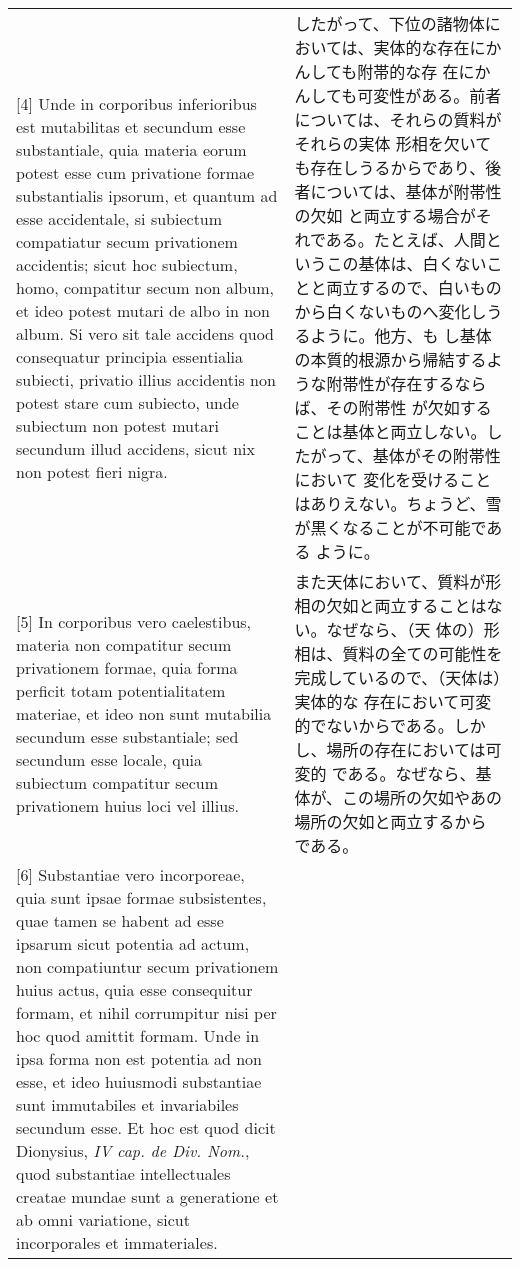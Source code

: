 \documentclass[10pt]{jsarticle} %
\begin{document}
\begin{longtable}{p{21em}p{21em}}
\\

[4] Unde in corporibus inferioribus est mutabilitas et secundum esse
substantiale, quia materia eorum potest esse cum privatione formae
substantialis ipsorum, et quantum ad esse accidentale, si subiectum
compatiatur secum privationem accidentis; sicut hoc subiectum, homo,
compatitur secum non album, et ideo potest mutari de albo in non
album.  Si vero sit tale accidens quod consequatur principia
essentialia subiecti, privatio illius accidentis non potest stare cum
subiecto, unde subiectum non potest mutari secundum illud accidens,
sicut nix non potest fieri nigra.

&

したがって、下位の諸物体においては、実体的な存在にかんしても附帯的な存
在にかんしても可変性がある。前者については、それらの質料がそれらの実体
形相を欠いても存在しうるからであり、後者については、基体が附帯性の欠如
と両立する場合がそれである。たとえば、人間というこの基体は、白くないこ
とと両立するので、白いものから白くないものへ変化しうるように。他方、も
し基体の本質的根源から帰結するような附帯性が存在するならば、その附帯性
が欠如することは基体と両立しない。したがって、基体がその附帯性において
変化を受けることはありえない。ちょうど、雪が黒くなることが不可能である
ように。


\\

[5] In corporibus vero caelestibus, materia non compatitur secum
privationem formae, quia forma perficit totam potentialitatem
materiae, et ideo non sunt mutabilia secundum esse substantiale; sed
secundum esse locale, quia subiectum compatitur secum privationem
huius loci vel illius.

&


また天体において、質料が形相の欠如と両立することはない。なぜなら、（天
体の）形相は、質料の全ての可能性を完成しているので、（天体は）実体的な
存在において可変的でないからである。しかし、場所の存在においては可変的
である。なぜなら、基体が、この場所の欠如やあの場所の欠如と両立するから
である。

\\

[6] Substantiae vero incorporeae, quia sunt ipsae formae subsistentes,
quae tamen se habent ad esse ipsarum sicut potentia ad actum, non
compatiuntur secum privationem huius actus, quia esse consequitur
formam, et nihil corrumpitur nisi per hoc quod amittit formam. Unde in
ipsa forma non est potentia ad non esse, et ideo huiusmodi substantiae
sunt immutabiles et invariabiles secundum esse. Et hoc est quod dicit
Dionysius, {\it IV cap. de Div. Nom.}, quod substantiae intellectuales
creatae mundae sunt a generatione et ab omni variatione, sicut
incorporales et immateriales.


\end{longtable}
\end{document}
